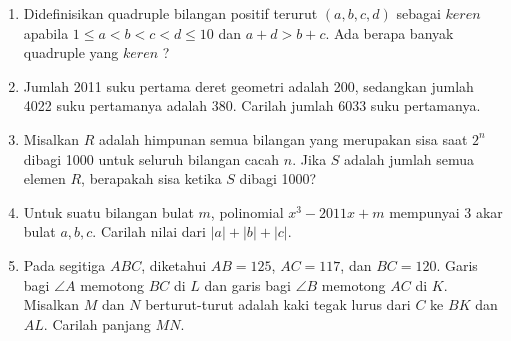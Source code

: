 \documentclass[12pt]{scrartcl}
\begin{document}
\begin{enumerate}
	\item
	Didefinisikan quadruple bilangan positif terurut $(a,b,c,d)$ sebagai $keren$ apabila $1 \le a < b < c < d \le 10$ dan $a+d > b+c$. Ada berapa banyak quadruple yang $keren$ ?
	
	\item  Jumlah 2011 suku pertama deret geometri adalah 200, sedangkan jumlah 4022 suku pertamanya adalah 380. Carilah jumlah 6033 suku pertamanya.
	
	\item
	Misalkan $R$ adalah himpunan semua bilangan yang merupakan sisa saat $2^n$ dibagi 1000 untuk seluruh bilangan cacah $n$. Jika $S$ adalah jumlah semua elemen $R$, berapakah sisa ketika $S$ dibagi 1000?
	
	\item
	Untuk suatu bilangan bulat $m$, polinomial $x^3-2011x+m$ mempunyai 3 akar bulat $a,b,c$. Carilah nilai dari $|a|+|b|+|c|$.
	
	\item
	Pada segitiga $ABC$, diketahui $AB=125$, $AC=117$, dan $BC=120$. Garis bagi $\angle A$ memotong $BC$ di $L$ dan garis bagi $\angle B$ memotong $AC$ di $K$. Misalkan $M$ dan $N$ berturut-turut adalah kaki tegak lurus dari $C$ ke $BK$ dan $AL$. Carilah panjang $MN$.
	\end{enumerate}
\end{document}
